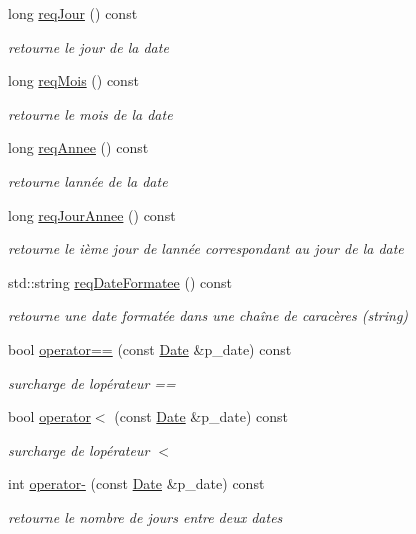 \begin{DoxyCompactItemize}
long \hyperlink{classutil_1_1Date_aa2b8c7a6e23e9244a5bac8342484d3b8}{req\+Jour} () const
\begin{DoxyCompactList}\small\item\em retourne le jour de la date \end{DoxyCompactList}\item 
long \hyperlink{classutil_1_1Date_a8002c391b812945da68b16cb4a424460}{req\+Mois} () const
\begin{DoxyCompactList}\small\item\em retourne le mois de la date \end{DoxyCompactList}\item 
long \hyperlink{classutil_1_1Date_aa7c4b428456da55a2e3769e93ad9bb8d}{req\+Annee} () const
\begin{DoxyCompactList}\small\item\em retourne l\textquotesingle{}année de la date \end{DoxyCompactList}\item 
long \hyperlink{classutil_1_1Date_a9e76af410b6be9ac4ea9ab4df5797847}{req\+Jour\+Annee} () const
\begin{DoxyCompactList}\small\item\em retourne le ième jour de l\textquotesingle{}année correspondant au jour de la date \end{DoxyCompactList}\item 
std\+::string \hyperlink{classutil_1_1Date_ad92d1e9c4d570c5f31a8e06cf2e1ae8c}{req\+Date\+Formatee} () const
\begin{DoxyCompactList}\small\item\em retourne une date formatée dans une chaîne de caracères (string) \end{DoxyCompactList}\item 
bool \hyperlink{classutil_1_1Date_a8114f8e40cee24e1d7a58b910e8f4637}{operator==} (const \hyperlink{classutil_1_1Date}{Date} \&p\+\_\+date) const
\begin{DoxyCompactList}\small\item\em surcharge de l\textquotesingle{}opérateur == \end{DoxyCompactList}\item 
bool \hyperlink{classutil_1_1Date_aefcf8a7520711f783fb0241d460480c5}{operator$<$} (const \hyperlink{classutil_1_1Date}{Date} \&p\+\_\+date) const
\begin{DoxyCompactList}\small\item\em surcharge de l\textquotesingle{}opérateur $<$ \end{DoxyCompactList}\item 
int \hyperlink{classutil_1_1Date_af12f2c545070b5e2b397be5379c5c3fd}{operator-\/} (const \hyperlink{classutil_1_1Date}{Date} \&p\+\_\+date) const
\begin{DoxyCompactList}\small\item\em retourne le nombre de jours entre deux dates \end{DoxyCompactList}\end{DoxyCompactItemize}
